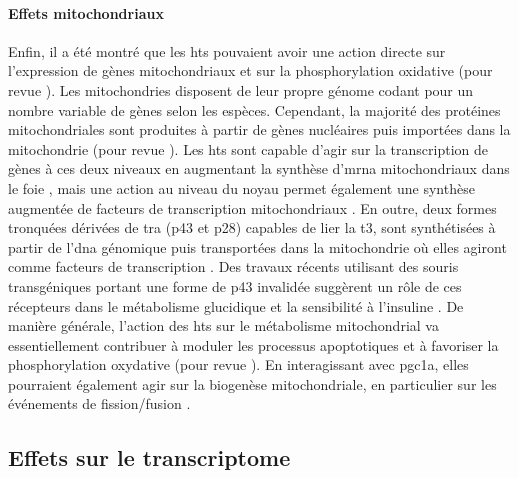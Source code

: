 \documentclass[../main.tex]{subfiles}
\begin{document}
\paragraph{Effets mitochondriaux}
Enfin, il a été montré que les \glspl{ht} pouvaient avoir une action directe sur l'expression de gènes mitochondriaux et sur la phosphorylation oxidative (pour revue \citealp{Wrutniak-Cabello2001}).
Les mitochondries disposent de leur propre génome codant pour un nombre variable de gènes selon les espèces.
Cependant, la majorité des protéines mitochondriales sont produites à partir de gènes nucléaires puis importées dans la mitochondrie (pour revue \citealp{Schaffer2007}).
Les \glspl{ht} sont capable d'agir sur la transcription de gènes à ces deux niveaux en augmentant la synthèse d’\gls{mrna} mitochondriaux dans le foie \citep{Enriquez1999}, mais une action au niveau du noyau permet également une synthèse augmentée de facteurs de transcription mitochondriaux \citep{Garstka1994}.
En outre, deux formes tronquées dérivées de \gls{tra} (p43 et p28) capables de lier la \gls{t3}, sont synthétisées à partir de l'\gls{dna} génomique puis transportées dans la mitochondrie où elles agiront comme facteurs de transcription \citep{Wrutniak1995}.
Des travaux récents utilisant des souris transgéniques portant une forme de p43 invalidée suggèrent un rôle de ces récepteurs dans le métabolisme glucidique et la sensibilité à l'insuline \citep{Bertrand2013}.
De manière générale, l'action des \glspl{ht} sur le métabolisme mitochondrial va essentiellement contribuer à moduler les processus apoptotiques et à favoriser la phosphorylation oxydative (pour revue \citealp{Psarra2008}).
En interagissant avec \gls{pgc1a}, elles pourraient également agir sur la biogenèse mitochondriale, en particulier sur les événements de fission/fusion \citep{Ventura-Clapier2008}.


\subsection{Effets sur le transcriptome}
\end{document}
